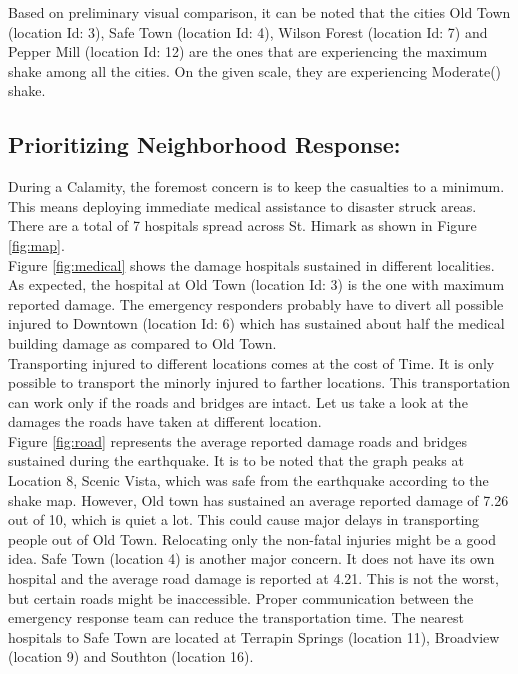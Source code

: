 \documentclass[12pt]{extarticle}
\begin{document}
Based on preliminary visual comparison, it can be noted that the cities Old Town (location Id: 3), Safe Town (location Id: 4), Wilson Forest (location Id: 7) and Pepper Mill (location Id: 12) are the ones that are experiencing the maximum shake among all the cities. On the given scale, they are experiencing Moderate() shake. 
	
\subsection{Prioritizing Neighborhood Response:}
During a Calamity, the foremost concern is to keep the casualties to a minimum. This means deploying immediate medical assistance to disaster struck areas. There are a total of 7 hospitals spread across St. Himark as shown in Figure \ref{fig:map}.  \\

Figure \ref{fig:medical} shows the damage hospitals sustained in different localities. As expected, the hospital at Old Town (location Id: 3) is the one with maximum reported damage. The emergency responders probably have to divert all possible injured to Downtown (location Id: 6) which has sustained about half the medical building damage as compared to Old Town.  \\

Transporting injured to different locations comes at the cost of Time. It is only possible to transport the minorly injured to farther locations. This transportation can work only if the roads and bridges are intact. Let us take a look at the damages the roads have taken at different location.  \\

Figure \ref{fig:road} represents the average reported damage roads and bridges sustained during the earthquake. It is to be noted that the graph peaks at Location 8, Scenic Vista, which was safe from the earthquake according to the shake map. However, Old town has sustained an average reported damage of 7.26 out of 10, which is quiet a lot. This could cause major delays in transporting people out of Old Town. Relocating only the non-fatal injuries might be a good idea. Safe Town (location 4) is another major concern. It does not have its own hospital and the average road damage is reported at 4.21. This is not the worst, but certain roads might be inaccessible. Proper communication between the emergency response team can reduce the transportation time. The nearest hospitals to Safe Town are located at Terrapin Springs (location 11), Broadview (location 9) and Southton (location 16). \\ 
\end{document}
